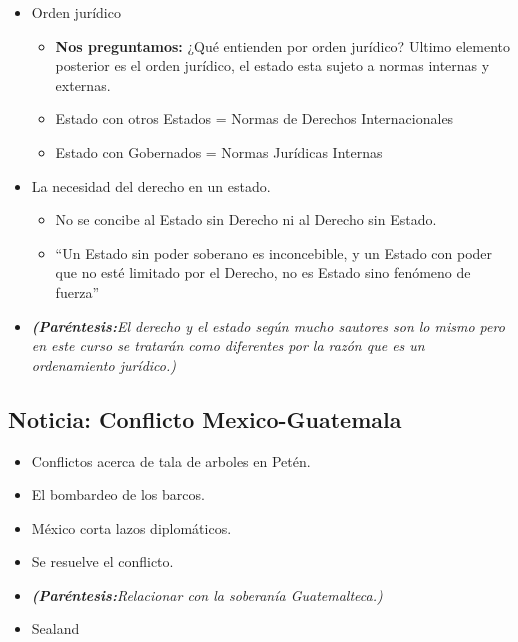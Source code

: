 \begin{itemize}
    \item Orden jurídico
    \begin{itemize}
        \item \textbf{Nos preguntamos:} ¿Qué entienden por orden jurídico? Ultimo elemento posterior es el orden jurídico, el estado esta sujeto a normas internas y externas.
        \item Estado con otros Estados = Normas de Derechos Internacionales
        \item Estado con Gobernados = Normas Jurídicas Internas
    \end{itemize}

    
    \item La necesidad del derecho en un estado.
    \begin{itemize}
        \item No se concibe al Estado sin Derecho ni al  Derecho sin Estado. 
        \item “Un Estado sin poder soberano es inconcebible, y un Estado con poder que no esté limitado por el Derecho, no es Estado sino fenómeno de fuerza”
    \end{itemize} 

    \item \emph{\textbf{(Paréntesis:}El derecho y el estado según mucho sautores son lo mismo pero en este curso se tratarán como diferentes por la razón que es un ordenamiento jurídico.)}
\end{itemize}

\subsection{Noticia: Conflicto Mexico-Guatemala}
\begin{itemize}
    \item Conflictos acerca de tala de arboles en Petén.
    \item El bombardeo de los barcos.
    \item México corta lazos diplomáticos.
    \item Se resuelve el conflicto.
    \item \emph{\textbf{(Paréntesis:}Relacionar con la soberanía Guatemalteca.)}
\end{itemize}

\begin{itemize}
    \item Sealand
\end{itemize}


